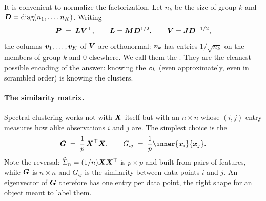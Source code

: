 It is convenient to normalize the factorization. Let \(n_k\) be the size of group \(k\) and \(\bm{D} = \operatorname{diag}(n_1, \dots, n_K)\). Writing
\begin{equation}
  \bm{P} \;=\; \bm{L} \bm{V}^{\top}, \qquad \bm{L} = \bm{M} \bm{D}^{1/2}, \qquad \bm{V} = \bm{J} \bm{D}^{-1/2},
  \label{eq:LV-factorisation}
\end{equation}
the columns \(\bm{v}_1, \dots, \bm{v}_K\) of \(\bm{V}\) are orthonormal: \(\bm{v}_k\) has entries \(1/\sqrt{n_k}\) on the members of group \(k\) and \(0\) elsewhere. We call them the . They are the cleanest possible encoding of the answer: knowing the \(\bm{v}_k\) (even approximately, even in scrambled order) is knowing the clusters.

\paragraph{The similarity matrix.}
Spectral clustering works not with \(\bm{X}\) itself but with an \(n \times n\)  whose \((i, j)\) entry measures how alike observations \(i\) and \(j\) are. The simplest choice is the 
\[
  \mat{G} \;=\; \frac{1}{p}\, \mat{X}\transpose \mat{X}, \qquad G_{i j} \;=\; \frac{1}{p} \inner{\vect{x}_i}{\vect{x}_j}.
\]
Note the reversal: \(\widehat{\Sigma}_n = (1/n)\bm{X}\bm{X}^{\top}\) is \(p \times p\) and built from pairs of features, while \(\bm{G}\) is \(n \times n\) and \(G_{ij}\) is the similarity between data points \(i\) and \(j\). An eigenvector of \(\bm{G}\) therefore has one entry per data point, the right shape for an object meant to label them.

